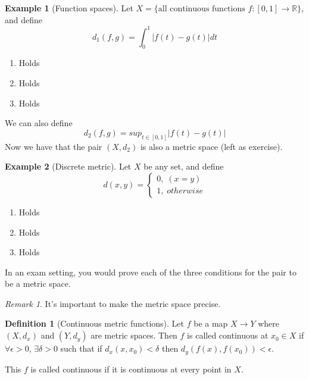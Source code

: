 \documentclass{article}
\theoremstyle{definition}
\newtheorem{defn}{Definition}[section]
\newtheorem{exmp}{Example}[section]
\theoremstyle{plain}%
\theoremstyle{remark}
\newtheorem*{rem}{Remark}
\begin{document}
\begin{exmp}[Function spaces] Let $X = \{\text{all continuous functions } f:[0,1] \to \mathbb{R}\}$, and define \[d_1(f,g) = \int_0^1 |f(t) - g(t)| dt\]

\begin{enumerate}
    \item Holds \checkmark
    \item Holds \checkmark
    \item Holds \checkmark
\end{enumerate}

\begin{flushleft}
We can also define \[d_2(f,g) = sup_{t \in [0,1]} |f(t)-g(t)|\] Now we have that the pair $(X, d_2)$ is also a metric space (left as exercise).
\end{flushleft}

\end{exmp}

\begin{exmp}[Discrete metric]
Let $X$ be any set, and define \[d(x,y) = \begin{cases} 0, \; (x=y) \\ 1, \; otherwise \end{cases}\]

\begin{enumerate}
    \item Holds \checkmark
    \item Holds \checkmark
    \item Holds \checkmark
\end{enumerate}

\end{exmp}

\begin{flushleft}
In an exam setting, you would prove each of the three conditions for the pair to be a metric space.
\end{flushleft}

\begin{rem}
It's important to make the metric space precise.
\end{rem}

\begin{defn}[Continuous metric functions]
Let $f$ be a map $X \to Y$ where $(X,d_x)$ and $(Y,d_y)$ are metric spaces. Then $f$ is called continuous at $x_0 \in X$ if $\forall \epsilon > 0$, $\exists \delta > 0$ such that if $d_x(x,x_0) < \delta$ then $d_y(f(x), f(x_0)) < \epsilon$.

This $f$ is called continuous if it is continuous at every point in $X$.
\end{defn}
\end{document}
